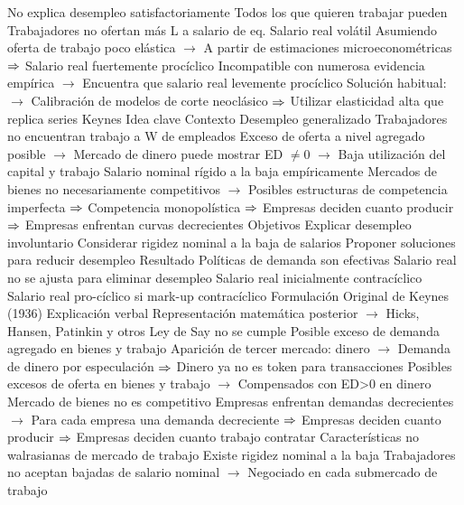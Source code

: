 \documentclass{nuevotema}
\begin{document}
\begin{esquemal}
				\4 No explica desempleo satisfactoriamente
				\4[] Todos los que quieren trabajar pueden
				\4[] Trabajadores no ofertan más L a salario de eq.
				\4 Salario real volátil
				\4[] Asumiendo oferta de trabajo poco elástica
				\4[] $\to$ A partir de estimaciones microeconométricas
				\4[] $\Rightarrow$ Salario real fuertemente procíclico
				\4[] Incompatible con numerosa evidencia empírica
				\4[] $\to$ Encuentra que salario real levemente procíclico
				\4[] Solución habitual:
				\4[] $\to$ Calibración de modelos de corte neoclásico
				\4[] $\Rightarrow$ Utilizar elasticidad alta que replica series
		\2 Keynes
			\3 Idea clave
				\4 Contexto
				\4[] Desempleo generalizado
				\4[] Trabajadores no encuentran trabajo a W de empleados
				\4[] Exceso de oferta a nivel agregado posible
				\4[] $\to$ Mercado de dinero puede mostrar ED $\neq 0$
				\4[] $\to$ Baja utilización del capital y trabajo
				\4[] Salario nominal rígido a la baja empíricamente
				\4[] Mercados de bienes no necesariamente competitivos
				\4[] $\to$ Posibles estructuras de competencia imperfecta
				\4[] $\Rightarrow$ Competencia monopolística
				\4[] $\Rightarrow$ Empresas deciden cuanto producir
				\4[] $\Rightarrow$ Empresas enfrentan curvas decrecientes
				\4 Objetivos
				\4[] Explicar desempleo involuntario
				\4[] Considerar rigidez nominal a la baja de salarios
				\4[] Proponer soluciones para reducir desempleo
				\4 Resultado
				\4[] Políticas de demanda son efectivas
				\4[] Salario real no se ajusta para eliminar desempleo
				\4[] Salario real inicialmente contracíclico
				\4[] Salario real pro-cíclico si mark-up contracíclico
			\3 Formulación
				\4 Original de Keynes (1936)
				\4[] Explicación verbal
				\4[] Representación matemática posterior
				\4[] $\to$ Hicks, Hansen, Patinkin y otros
				\4 Ley de Say no se cumple
				\4[] Posible exceso de demanda agregado en bienes y trabajo
				\4[] Aparición de tercer mercado: dinero
				\4[] $\to$ Demanda de dinero por especulación
				\4[] $\Rightarrow$ Dinero ya no es token para transacciones
				\4[] Posibles excesos de oferta en bienes y trabajo
				\4[] $\to$ Compensados con ED>0 en dinero
				\4 Mercado de bienes no es competitivo
				\4[] Empresas enfrentan demandas decrecientes
				\4[] $\to$ Para cada empresa una demanda decreciente
				\4[] $\Rightarrow$ Empresas deciden cuanto producir
				\4[] $\Rightarrow$ Empresas deciden cuanto trabajo contratar
				\4 Características no walrasianas de mercado de trabajo
				\4[] Existe rigidez nominal a la baja
				\4[] Trabajadores no aceptan bajadas de salario nominal
				\4[] $\to$ Negociado en cada submercado de trabajo

\end{esquemal}
\end{document}

